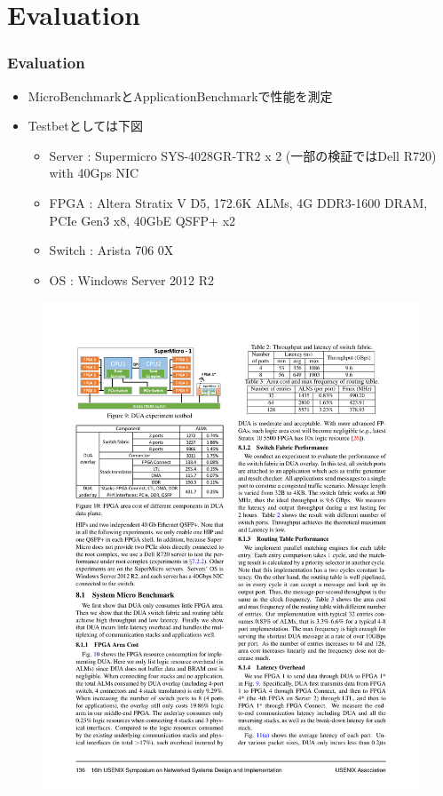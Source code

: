 \documentclass[dvipdfmx,9pt,notheorems]{beamer}
\theoremstyle{definition}
\begin{document}
\section{Evaluation}
\begin{frame}\frametitle{Evaluation}
	\begin{itemize}
			\item MicroBenchmarkとApplicationBenchmarkで性能を測定
			\item Testbetとしては下図
				\begin{itemize}
					\item Server : Supermicro SYS-4028GR-TR2 x 2 (一部の検証ではDell R720) with 40Gps NIC
					\item FPGA : Altera Stratix V D5, 172.6K ALMs, 4G DDR3-1600 DRAM, PCIe Gen3 x8, 40GbE QSFP+ x2
					\item Switch : Arista 706 0X
					\item OS : Windows Server 2012 R2
				\end{itemize}
	\end{itemize}
  \begin{figure}[htb]
		\includegraphics[scale=1.0]{fig/figure9.pdf}
  \end{figure}
\pnote{
}
\end{frame}
\end{document}
